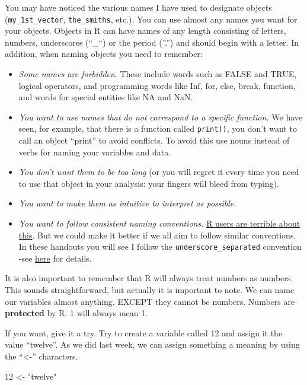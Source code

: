 \documentclass[
]{book}
\newenvironment{Shaded}{\begin{snugshade}}{\end{snugshade}}
\newcommand{\DecValTok}[1]{\textcolor[rgb]{0.00,0.00,0.81}{#1}}
\newcommand{\OtherTok}[1]{\textcolor[rgb]{0.56,0.35,0.01}{#1}}
\newcommand{\StringTok}[1]{\textcolor[rgb]{0.31,0.60,0.02}{#1}}
\begin{document}
You may have noticed the various names I have used to designate objects (\texttt{my\_1st\_vector}, \texttt{the\_smiths}, etc.). You can use almost any names you want for your objects. Objects in R can have names of any length consisting of letters, numbers, underscores (``\_``) or the period (''.'') and should begin with a letter. In addition, when naming objects you need to remember:

\begin{itemize}
\item
  \emph{Some names are forbidden}. These include words such as FALSE and TRUE, logical operators, and programming words like Inf, for, else, break, function, and words for special entities like NA and NaN.
\item
  \emph{You want to use names that do not correspond to a specific function.} We have seen, for example, that there is a function called \texttt{print()}, you don't want to call an object ``print'' to avoid conflicts. To avoid this use nouns instead of verbs for naming your variables and data.
\item
  \emph{You don't want them to be too long} (or you will regret it every time you need to use that object in your analysis: your fingers will bleed from typing).
\item
  \emph{You want to make them as intuitive to interpret as possible.}
\item
  \emph{You want to follow consistent naming conventions.} \href{http://journal.r-project.org/archive/2012-2/RJournal_2012-2_Baaaath.pdf}{R users are terrible about this}. But we could make it better if we all aim to follow similar conventions. In these handouts you will see I follow the \texttt{underscore\_separated} convention -see \href{https://style.tidyverse.org/syntax.html}{here} for details.
\end{itemize}

It is also important to remember that R will always treat numbers as numbers. This sounds straightforward, but actually it is important to note. We can name our variables almost anything. EXCEPT they cannot be numbers. Numbers are \textbf{protected} by R. 1 will always mean 1.

If you want, give it a try. Try to create a variable called 12 and assign it the value ``twelve''. As we did last week, we can assign something a meaning by using the ``\textless-'' characters.

\begin{Shaded}
\begin{Highlighting}[]
\DecValTok{12} \OtherTok{\textless{}{-}} \StringTok{"twelve"}
\end{Highlighting}
\end{Shaded}
\end{document}

